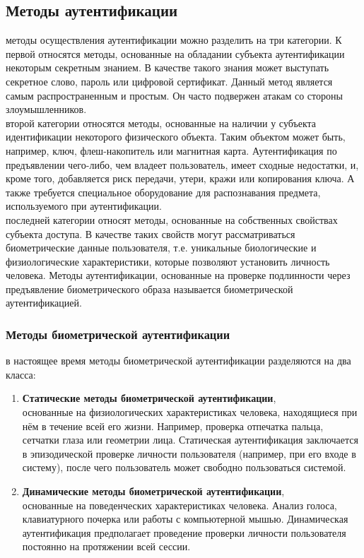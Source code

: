 \documentclass[12pt]{article}
\begin{document}
    
    \subsection{Методы аутентификации}
    
     методы осуществления аутентификации можно разделить на три категории. К первой относятся методы, основанные на обладании субъекта аутентификации некоторым секретным знанием. В качестве такого знания может выступать секретное слово, пароль или цифровой сертификат. Данный метод является самым распространенным и простым. Он часто подвержен атакам со стороны злоумышленников. \\
     второй категории относятся методы, основанные на наличии у субъекта идентификации некоторого физического объекта. Таким объектом может быть, например, ключ, флеш-накопитель или магнитная карта. Аутентификация по предъявлении чего-либо, чем владеет пользователь, имеет сходные недостатки, и, кроме того, добавляется риск передачи, утери, кражи или копирования ключа. А также требуется специальное оборудование для распознавания предмета, используемого при аутентификации. \\
     последней категории относят методы, основанные на собственных свойствах субъекта доступа. В качестве таких свойств могут рассматриваться биометрические данные пользователя, т.е. уникальные биологические и физиологические характеристики, которые позволяют установить личность человека. Методы аутентификации, основанные на проверке подлинности через предъявление биометрического образа называется биометрической аутентификацией. \\
    
    \subsubsection{Методы биометрической аутентификации}

     в настоящее время методы биометрической аутентификации разделяются на два класса:
    \begin{enumerate}
        \item \textbf{Статические методы биометрической аутентификации}, \\
        основанные на физиологических характеристиках человека, находящиеся при нём в течение всей его жизни. Например, проверка отпечатка пальца, сетчатки глаза или геометрии лица. Статическая аутентификация заключается в эпизодической проверке личности пользователя (например, при его входе в систему), после чего пользователь может свободно пользоваться системой.
        \item \textbf{Динамические методы биометрической аутентификации}, \\
        основанные на поведенческих характеристиках человека. Анализ голоса, клавиатурного почерка или работы с компьютерной мышью. Динамическая аутентификация предполагает проведение проверки личности пользователя постоянно на протяжении всей сессии.
    \end{enumerate}
\end{document}
